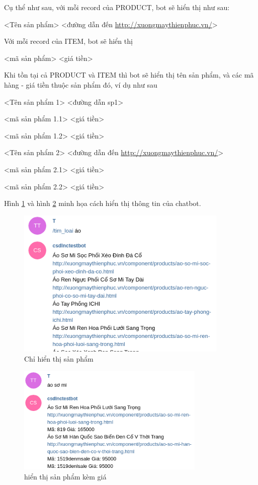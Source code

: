 Cụ thể như sau, với mỗi record của PRODUCT, bot sẽ hiển thị như sau: 

<Tên sản phẩm> <đường dẫn đến \url{http://xuongmaythienphuc.vn/}> 

\smallskip

Với mỗi record của ITEM, bot sẽ hiển thị 

<mã sản phẩm> <giá tiền> 

\smallskip 

Khi tồn tại cả PRODUCT và ITEM thì bot sẽ hiển thị tên sản phẩm, và các mã hàng - giá tiền thuộc sản phẩm đó, ví dụ như sau 

<Tên sản phẩm 1> <đường dẫn sp1> 

<mã sản phẩm 1.1> <giá tiền> 

<mã sản phẩm 1.2> <giá tiền> 

<Tên sản phẩm 2> <đường dẫn đến \url{http://xuongmaythienphuc.vn/}> 

<mã sản phẩm 2.1> <giá tiền> 

<mã sản phẩm 2.2> <giá tiền> 

Hình \ref{fig:displayproduct} và hình \ref{fig:displayproductitem} minh họa cách hiển thị thông tin của chatbot. 

\begin{figure}[H]
\centering
\includegraphics[width=0.9\textwidth]{imagev2/displayproduct.png}
\caption{\label{fig:displayproduct} Chỉ hiển thị sản phẩm}
\end{figure}

\begin{figure}[H]
\centering
\includegraphics[width=0.8\textwidth]{imagev2/displayproductitem.png}
\caption{\label{fig:displayproductitem} hiển thị sản phẩm kèm giá }
\end{figure}

